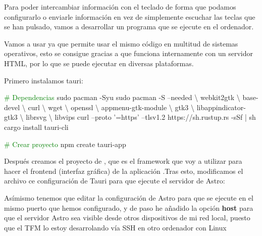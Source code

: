 Para poder intercambiar información con el teclado de forma que podamos configurarlo o enviarle información en vez de simplemente escuchar las teclas que se han pulsado, vamos a desarrollar un programa que se ejecute en el ordenador. 

Vamos a usar  ya que permite usar el mismo código en multitud de sistemas operativos, esto se consigue gracias a que funciona internamente con un servidor HTML, por lo que se puede ejecutar en diversas plataformas.

Primero instalamos tauri:
\begin{multicli}
    \textcolor{green}{\# Dependencias} \newline
    \cliarrow sudo pacman -Syu \newline
    \cliarrow sudo pacman -S --needed \textbackslash \newline
    \mytab webkit2gtk \textbackslash \newline
    \mytab base-devel \textbackslash \newline
    \mytab curl \textbackslash \newline
    \mytab wget \textbackslash \newline
    \mytab openssl \textbackslash \newline
    \mytab appmenu-gtk-module  \textbackslash \newline
    \mytab gtk3 \textbackslash \newline
    \mytab libappindicator-gtk3 \textbackslash \newline
    \mytab librsvg \textbackslash \newline
    \mytab libvips \newline
    \cliarrow curl --proto '=https' --tlsv1.2 https://sh.rustup.rs -sSf | sh \newline
    \cliarrow cargo install tauri-cli \newline

    \textcolor{green}{\# Crear proyecto} \newline
    \cliarrow npm create tauri-app
\end{multicli}

Después creamos el proyecto de , que es el framework que voy a utilizar para hacer el frontend (interfaz gráfica) de la aplicación .Tras esto, modificamos el archivo ce configuración de Tauri para que ejecute el servidor de Astro:

\newpage
Asímismo tenemos que editar la configuración de Astro para que se ejecute en el mismo puerto que hemos configurado, y de paso he añadido la opción \textbf{host} para que el servidor Astro sea visible desde otros dispositivos de mi red local, puesto que el TFM lo estoy desarrolando vía SSH en otro ordenador con Linux

